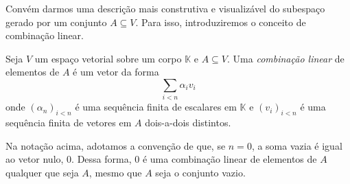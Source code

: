 Convém darmos uma descrição mais construtiva e visualizável do subespaço gerado por um conjunto $A \subseteq V$.
Para isso, introduziremos o conceito de combinação linear.

\begin{definition}
    Seja $V$ um espaço vetorial sobre um corpo $\mathbb K$ e $A \subseteq V$.
    Uma \emph{combinação linear} de elementos de $A$ é um vetor da forma
    \begin{equation*}
        \sum_{i<n} \alpha_i v_i
    \end{equation*}
    onde $(\alpha_n)_{i<n}$ é uma sequência finita de escalares em $\mathbb K$ e $(v_i)_{i<n}$ é uma sequência finita de vetores em $A$ dois-a-dois distintos.
\end{definition}

Na notação acima, adotamos a convenção de que, se $n=0$, a soma vazia é igual ao vetor nulo, $0$.
Dessa forma, $0$ é uma combinação linear de elementos de $A$ qualquer que seja $A$, mesmo que $A$ seja o conjunto vazio.

